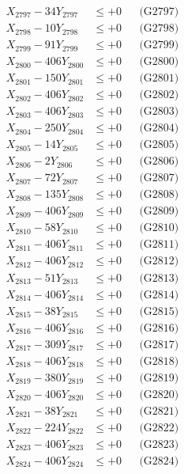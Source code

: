 \documentclass[a4paper,10pt]{article}
\begin{document}
{\begin{align}
X_{2797} - 34Y_{2797} &\leq +0 && \text{(G2797)} \\
X_{2798} - 10Y_{2798} &\leq +0 && \text{(G2798)} \\
X_{2799} - 91Y_{2799} &\leq +0 && \text{(G2799)} \\
X_{2800} - 406Y_{2800} &\leq +0 && \text{(G2800)} \\
\allowbreak
X_{2801} - 150Y_{2801} &\leq +0 && \text{(G2801)} \\
X_{2802} - 406Y_{2802} &\leq +0 && \text{(G2802)} \\
X_{2803} - 406Y_{2803} &\leq +0 && \text{(G2803)} \\
X_{2804} - 250Y_{2804} &\leq +0 && \text{(G2804)} \\
X_{2805} - 14Y_{2805} &\leq +0 && \text{(G2805)} \\
X_{2806} - 2Y_{2806} &\leq +0 && \text{(G2806)} \\
X_{2807} - 72Y_{2807} &\leq +0 && \text{(G2807)} \\
X_{2808} - 135Y_{2808} &\leq +0 && \text{(G2808)} \\
X_{2809} - 406Y_{2809} &\leq +0 && \text{(G2809)} \\
X_{2810} - 58Y_{2810} &\leq +0 && \text{(G2810)} \\
\allowbreak
X_{2811} - 406Y_{2811} &\leq +0 && \text{(G2811)} \\
X_{2812} - 406Y_{2812} &\leq +0 && \text{(G2812)} \\
X_{2813} - 51Y_{2813} &\leq +0 && \text{(G2813)} \\
X_{2814} - 406Y_{2814} &\leq +0 && \text{(G2814)} \\
X_{2815} - 38Y_{2815} &\leq +0 && \text{(G2815)} \\
X_{2816} - 406Y_{2816} &\leq +0 && \text{(G2816)} \\
X_{2817} - 309Y_{2817} &\leq +0 && \text{(G2817)} \\
X_{2818} - 406Y_{2818} &\leq +0 && \text{(G2818)} \\
X_{2819} - 380Y_{2819} &\leq +0 && \text{(G2819)} \\
X_{2820} - 406Y_{2820} &\leq +0 && \text{(G2820)} \\
\allowbreak
X_{2821} - 38Y_{2821} &\leq +0 && \text{(G2821)} \\
X_{2822} - 224Y_{2822} &\leq +0 && \text{(G2822)} \\
X_{2823} - 406Y_{2823} &\leq +0 && \text{(G2823)} \\
X_{2824} - 406Y_{2824} &\leq +0 && \text{(G2824)} \\

\end{align}}
\end{document}
